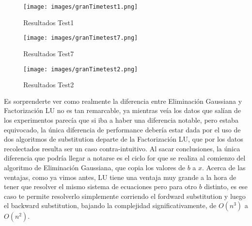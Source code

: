 \documentclass[a4paper]{article}
\begin{document}
   \begin{minipage}[t]{0.45\linewidth}
      \begin{figure}[H]
      \centering
      \texttt{[image: images/granTimetest1.png]}
      \caption{Resultados Test1}
      \label{exp1plot}
      \end{figure}
   \end{minipage}%
   \hfill
   \begin{minipage}[t]{0.45\linewidth}
     \centering
         \begin{figure}[H]
        \centering
        \texttt{[image: images/granTimetest7.png]}
        \caption{Resultados Test7}
        \label{exp1plot}
        \end{figure}
   \end{minipage}
  \begin{center}
   \begin{minipage}[t]{0.45\linewidth}
    \begin{figure}[H]
    \centering
    \texttt{[image: images/granTimetest2.png]}
    \caption{Resultados Test2}
    \label{exp1plot}
    \end{figure}
   \end{minipage}%
   \end{center}

Es sorprenderte ver como realmente la diferencia entre Eliminación Gaussiana y Factorización LU no es tan remarcable, ya mientras veía los datos que salían de los experimentos parecía que si iba a haber una diferencia notable, pero estaba equivocado, la única diferencia de performance debería estar dada por el uso de dos algoritmos de substitution departe de la Factorización LU, que por los datos recolectados resulta ser un caso contra-intuitivo. Al sacar conclusiones, la única diferencia que podría llegar a notarse es el ciclo for que se realiza al comienzo del algoritmo de Eliminación Gaussiana, que copia los valores de $b$ a $x$. 
Acerca de las ventajas, como ya vimos antes, LU tiene una ventaja muy grande a la hora de tener que resolver el mismo sistema de ecuaciones pero para otro $b$ distinto, es ese caso te permite resolverlo simplemente corriendo el fordward substitution y luego el backward substitution, bajando la complejidad significativamente, de $O(n^3)$ a $O(n^2)$.
\end{document}
